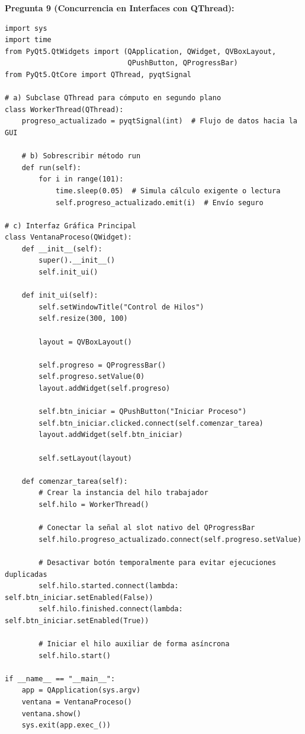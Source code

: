 \documentclass[12pt,letterpaper]{article}
\begin{document}
\pagebreak

\textbf{Pregunta 9 (Concurrencia en Interfaces con QThread):}
\begin{verbatim}
import sys
import time
from PyQt5.QtWidgets import (QApplication, QWidget, QVBoxLayout, 
                             QPushButton, QProgressBar)
from PyQt5.QtCore import QThread, pyqtSignal

# a) Subclase QThread para cómputo en segundo plano
class WorkerThread(QThread):
    progreso_actualizado = pyqtSignal(int)  # Flujo de datos hacia la GUI

    # b) Sobrescribir método run
    def run(self):
        for i in range(101):
            time.sleep(0.05)  # Simula cálculo exigente o lectura
            self.progreso_actualizado.emit(i)  # Envío seguro

# c) Interfaz Gráfica Principal
class VentanaProceso(QWidget):
    def __init__(self):
        super().__init__()
        self.init_ui()

    def init_ui(self):
        self.setWindowTitle("Control de Hilos")
        self.resize(300, 100)

        layout = QVBoxLayout()

        self.progreso = QProgressBar()
        self.progreso.setValue(0)
        layout.addWidget(self.progreso)

        self.btn_iniciar = QPushButton("Iniciar Proceso")
        self.btn_iniciar.clicked.connect(self.comenzar_tarea)
        layout.addWidget(self.btn_iniciar)

        self.setLayout(layout)

    def comenzar_tarea(self):
        # Crear la instancia del hilo trabajador
        self.hilo = WorkerThread()
        
        # Conectar la señal al slot nativo del QProgressBar
        self.hilo.progreso_actualizado.connect(self.progreso.setValue)
        
        # Desactivar botón temporalmente para evitar ejecuciones duplicadas
        self.hilo.started.connect(lambda: self.btn_iniciar.setEnabled(False))
        self.hilo.finished.connect(lambda: self.btn_iniciar.setEnabled(True))

        # Iniciar el hilo auxiliar de forma asíncrona
        self.hilo.start()

if __name__ == "__main__":
    app = QApplication(sys.argv)
    ventana = VentanaProceso()
    ventana.show()
    sys.exit(app.exec_())
\end{verbatim}
\end{document}

